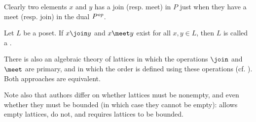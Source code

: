 Clearly two elements $x$ and $y$ has a join (resp. meet) in $P$ just when they have a meet (resp. join) in the dual $\dualord{P}$.

\begin{definition}[Lattices]
    Let $L$ be a poset. If $x \join y$ and $x \meet y$ exist for all $x,y \in L$, then $L$ is called a .


\end{definition}
%
%
There is also an algebraic theory of lattices in which the operations $\join$ and $\meet$ are primary, and in which the order is defined using these operations (cf. \cite[Chapter~2]{davey-priestley-order}). Both approaches are equivalent.

Note also that authors differ on whether lattices must be nonempty, and even whether they must be bounded (in which case they cannot be empty): \Textcite[Definition~8.1]{schroeder-ordered-sets} allows empty lattices, \textcite[Definition~2.4]{davey-priestley-order} do not, and \textcite[§1.4]{johnstone-stone-spaces} requires lattices to be bounded.


